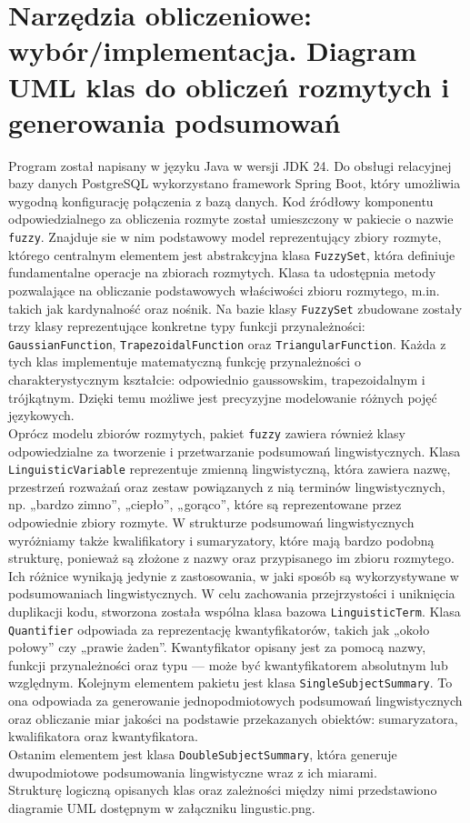 \documentclass{article}
\begin{document}
\section{Narzędzia obliczeniowe: wybór/implementacja. Diagram UML klas do obliczeń rozmytych i generowania podsumowań}
Program został napisany w języku Java w wersji JDK 24. Do obsługi relacyjnej bazy danych PostgreSQL wykorzystano framework Spring Boot, który umożliwia wygodną konfigurację połączenia z bazą danych. Kod źródłowy komponentu odpowiedzialnego za obliczenia rozmyte został umieszczony w pakiecie o nazwie \texttt{fuzzy}. Znajduje sie w nim podstawowy model reprezentujący zbiory rozmyte, którego centralnym elementem jest abstrakcyjna klasa \texttt{FuzzySet}, która definiuje fundamentalne operacje na zbiorach rozmytych. Klasa ta udostępnia metody pozwalające na obliczanie podstawowych właściwości zbioru rozmytego, m.in. takich jak kardynalność oraz nośnik. Na bazie klasy \texttt{FuzzySet} zbudowane zostały trzy klasy reprezentujące konkretne typy funkcji przynależności: \texttt{GaussianFunction}, \texttt{TrapezoidalFunction} oraz \texttt{TriangularFunction}. Każda z tych klas implementuje matematyczną funkcję przynależności o charakterystycznym kształcie: odpowiednio gaussowskim, trapezoidalnym i trójkątnym. Dzięki temu możliwe jest precyzyjne modelowanie różnych pojęć językowych. \\
Oprócz modelu zbiorów rozmytych, pakiet \texttt{fuzzy} zawiera również klasy odpowiedzialne za tworzenie i przetwarzanie podsumowań lingwistycznych. Klasa \texttt{LinguisticVariable} reprezentuje zmienną lingwistyczną, która zawiera nazwę, przestrzeń rozważań oraz zestaw powiązanych z nią terminów lingwistycznych, np. „bardzo zimno”, „ciepło”, „gorąco”, które są reprezentowane przez odpowiednie zbiory rozmyte.
W strukturze podsumowań lingwistycznych wyróżniamy także kwalifikatory i sumaryzatory, które mają bardzo podobną strukturę, ponieważ są złożone z nazwy oraz przypisanego im zbioru rozmytego. Ich różnice wynikają jedynie z zastosowania, w jaki sposób są wykorzystywane w podsumowaniach lingwistycznych. W celu zachowania przejrzystości i uniknięcia duplikacji kodu, stworzona została wspólna klasa bazowa \texttt{LinguisticTerm}. 
Klasa \texttt{Quantifier} odpowiada za reprezentację kwantyfikatorów, takich jak „około połowy” czy „prawie żaden”. Kwantyfikator opisany jest za pomocą nazwy, funkcji przynależności oraz typu — może być kwantyfikatorem absolutnym lub względnym.
Kolejnym elementem pakietu jest klasa \texttt{SingleSubjectSummary}. To ona odpowiada za generowanie jednopodmiotowych podsumowań lingwistycznych oraz obliczanie miar jakości na podstawie przekazanych obiektów: sumaryzatora, kwalifikatora oraz kwantyfikatora. \\
Ostanim elementem jest klasa \texttt{DoubleSubjectSummary}, która generuje dwupodmiotowe podsumowania lingwistyczne wraz z ich miarami. \\
Strukturę logiczną opisanych klas oraz zależności między nimi przedstawiono diagramie UML dostępnym w załączniku lingustic.png.
\end{document}
